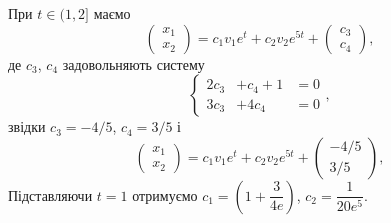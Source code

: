 \begin{solution}
\begin{enumerate}
		При $t \in (1, 2]$ маємо 
		\[
			\begin{pmatrix}
				x_1 \\
				x_2
			\end{pmatrix}
			=
			c_1 v_1 e^t 
			+ 
			c_2 v_2 e^{5t} 
			+ 
			\begin{pmatrix} 
				c_3 \\
				c_4
			\end{pmatrix},
		\]
		де $c_3$, $c_4$ задовольняють систему 
		\[
			\left\{
				\begin{aligned}
					2c_3 &+ c_4 + 1 &= 0 \\
					3c_3 &+ 4c_4 &= 0
				\end{aligned}
			\right.,
		\]
		звідки $c_3 = -4/5$, $c_4 = 3/5$ і 
		\[
			\begin{pmatrix}
				x_1 \\
				x_2
			\end{pmatrix}
			=
			c_1 v_1 e^t 
			+ 
			c_2 v_2 e^{5t} 
			+ 
			\begin{pmatrix} 
				-4/5 \\
				3/5
			\end{pmatrix},
		\]
		Підставляючи $t = 1$ отримуємо $c_1 = \left(1 + \dfrac{3}{4e}\right)$, $c_2 = \dfrac{1}{20e^5}$.\\
		

\end{enumerate}
\end{solution}
